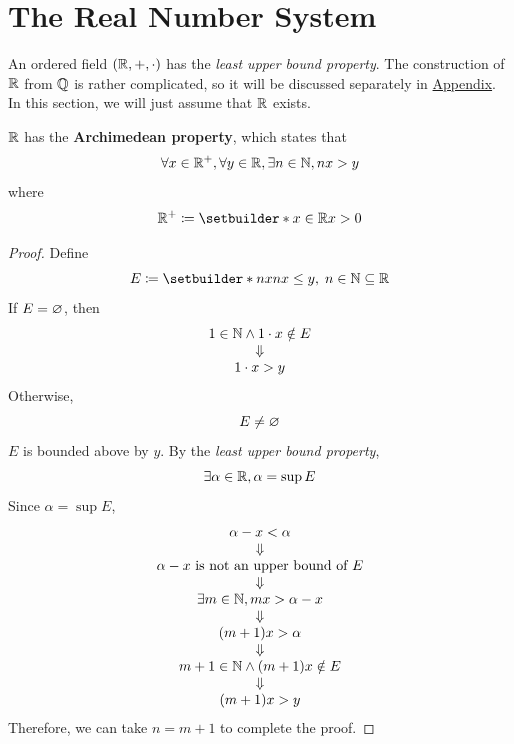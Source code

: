 \section{The Real Number System}

An ordered field $(\mathbb{R}, +, \cdot)$ has the \emph{least upper bound property}. The construction of $\mathbb{R}$ from $\mathbb{Q}$
is rather complicated, so it will be discussed separately in \hyperref[an:ch:construction-of-R]{Appendix}.
In this section, we will just assume that $\mathbb{R}$ exists.

\bigskip

\begin{theorem} \label{an:thm:archimedean-property}
    $\mathbb{R}$ has the \textbf{Archimedean property}, which states that
    \[
    \forall x \in \mathbb{R}^{+}, \forall y \in \mathbb{R}, \exists n \in \mathbb{N}, nx > y
    \]
    where
    \[
    \R^{+} \coloneqq \setbuilder*{x \in \R}{x > 0}
    \]
\end{theorem}

\begin{proof}
    Define
    \[
    E \coloneqq \setbuilder*{nx}{nx \leq y, \; n \in \N} \subseteq \R
    \]
    If $E = \varnothing$, then
    \[
    \begin{array}{c}
        1 \in \mathbb{N} \land 1 \cdot x \notin E \\
        \Downarrow \\
        1 \cdot x > y \\
    \end{array}
    \]
    Otherwise,
    \[
    E \neq \varnothing
    \]
    $E$ is bounded above by $y$. By the \emph{least upper bound property},
    \[
    \exists \alpha \in \mathbb{R}, \alpha = \sup E
    \]
    Since $\alpha = \sup E$,
    \[
    \begin{array}{c}
        \alpha - x < \alpha \\
        \Downarrow \\
        \alpha - x \text{ is not an upper bound of } E \\
        \Downarrow \\
        \exists m \in \mathbb{N}, mx > \alpha - x \\
        \Downarrow \\
        (m + 1)x > \alpha \\
        \Downarrow \\
        m + 1 \in \mathbb{N} \land (m + 1)x \notin E \\
        \Downarrow \\
        (m + 1)x > y
    \end{array}
    \]
    Therefore, we can take $n = m + 1$ to complete the proof.
\end{proof}

